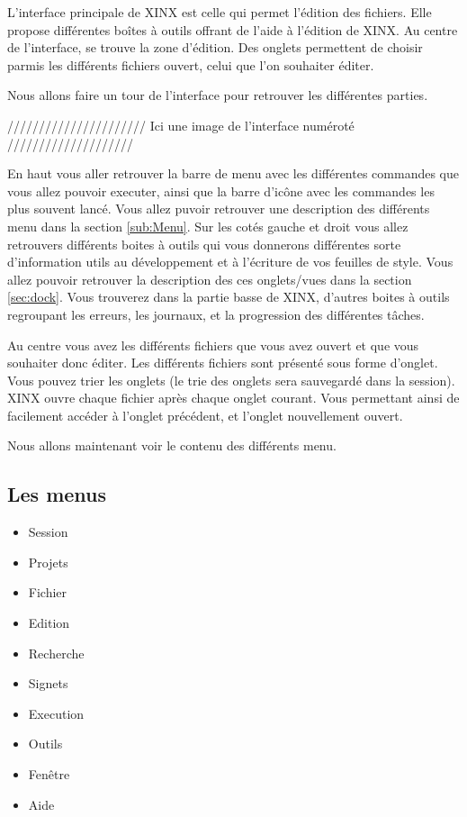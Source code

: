 \documentclass[a4paper,10pt,twoside]{book}
\begin{document}
L'interface principale de XINX est celle qui permet l'édition des fichiers. Elle propose différentes boîtes à outils offrant de l'aide à l'édition de XINX. Au centre de l'interface, se trouve la zone d'édition. Des onglets permettent de choisir parmis les différents fichiers ouvert, celui que l'on souhaiter éditer.

Nous allons faire un tour de l'interface pour retrouver les différentes parties.

////////////////////// Ici une image de l'interface numéroté ////////////////////


En haut vous aller retrouver la barre de menu avec les différentes commandes que vous allez pouvoir executer, ainsi que la barre d'icône avec les commandes les plus souvent lancé. Vous allez puvoir retrouver une description des différents menu dans la section \ref{sub:Menu}. Sur les cotés gauche et droit vous allez retrouvers différents boites à outils qui vous donnerons différentes sorte d'information utils au développement et à l'écriture de vos feuilles de style. Vous allez pouvoir retrouver la description des ces onglets/vues dans la section \ref{sec:dock}. Vous trouverez dans la partie basse de XINX, d'autres boites à outils regroupant les erreurs, les journaux, et la progression des différentes tâches.

Au centre vous avez les différents fichiers que vous avez ouvert et que vous souhaiter donc éditer. Les différents fichiers sont présenté sous forme d'onglet. Vous pouvez trier les onglets (le trie des onglets sera sauvegardé dans la session). XINX ouvre chaque fichier après chaque onglet courant. Vous permettant ainsi de facilement accéder à l'onglet précédent, et l'onglet nouvellement ouvert.

Nous allons maintenant voir le contenu des différents menu.

\subsection{Les menus}
\label{sub:menu}

\begin{itemize}
  \item Session 
  \item Projets
  \item Fichier
  \item Edition
  \item Recherche
  \item Signets
  \item Execution
  \item Outils
  \item Fenêtre
  \item Aide
\end{itemize}
\end{document}
